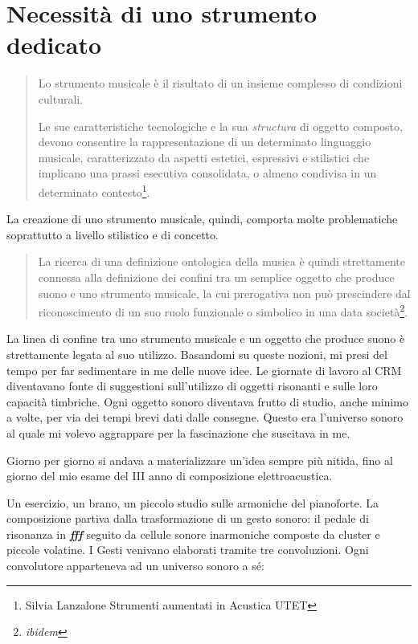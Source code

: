 \section{Necessità di uno strumento dedicato}

\begin{small}
\begin{quotation}
Lo strumento musicale è il risultato di un insieme complesso di condizioni culturali.

Le sue caratteristiche tecnologiche e la sua \textit{structura} di oggetto composto, devono consentire la rappresentazione di un determinato linguaggio musicale, caratterizzato da aspetti estetici, espressivi e stilistici che implicano una prassi esecutiva consolidata, o almeno condivisa in un determinato contesto\footnote{Silvia Lanzalone Strumenti aumentati in Acustica UTET}.
\end{quotation}
\end{small}

La creazione di uno strumento musicale, quindi, comporta molte problematiche soprattutto a livello stilistico e di concetto. 

\begin{small}
\begin{quotation}
La ricerca di una definizione ontologica della musica è quindi strettamente connessa alla definizione dei confini tra un semplice oggetto che produce suono e uno strumento musicale, la cui prerogativa non può prescindere dal riconoscimento di un suo ruolo funzionale o simbolico in una data società\footnote{\textit{ibidem}}.
\end{quotation}
\end{small}

La linea di confine tra uno strumento musicale e un oggetto che produce suono è strettamente legata al suo utilizzo. Basandomi su queste nozioni, mi presi del tempo per far sedimentare in me delle nuove idee. Le giornate di lavoro al CRM diventavano fonte di suggestioni sull'utilizzo di oggetti risonanti e sulle loro capacità timbriche. Ogni oggetto sonoro diventava frutto di studio, anche minimo a volte, per via dei tempi brevi dati dalle consegne. Questo era l'universo sonoro al quale mi volevo aggrappare per la fascinazione che suscitava in me.

Giorno per giorno si andava a materializzare un'idea sempre più nitida, fino al giorno del mio esame del III anno di composizione elettroacustica.

Un esercizio, un brano, un piccolo studio sulle armoniche del pianoforte. La composizione partiva dalla trasformazione di un gesto sonoro: il pedale di risonanza in \textit{\textbf{fff}} seguito da cellule sonore inarmoniche composte da cluster e piccole volatine. I Gesti venivano elaborati tramite tre convoluzioni. Ogni convolutore apparteneva ad un universo sonoro a sé:

